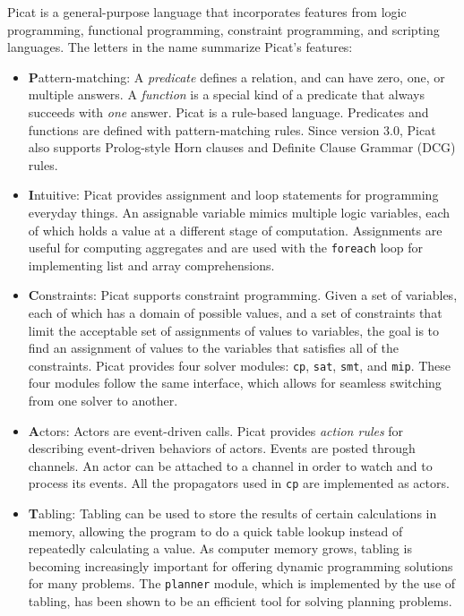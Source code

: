 Picat is a general-purpose language that incorporates features from logic programming, functional programming, constraint programming,  and scripting languages. The letters in the name summarize Picat's features:

\begin{itemize}
\item \textbf{P}attern-matching: A \emph{predicate} defines a relation, and can have zero, one, or multiple answers. A \emph{function} is a special kind of a predicate that always succeeds with \emph{one} answer. Picat is a rule-based language. Predicates and functions are defined with pattern-matching rules. Since version 3.0, Picat also supports Prolog-style Horn clauses and Definite Clause Grammar (DCG) rules.

\item \textbf{I}ntuitive: Picat provides assignment and loop statements for programming everyday things. An assignable variable mimics multiple logic variables, each of which holds a value at a different stage of computation. Assignments are useful for computing aggregates and are used with the {\tt foreach} loop for implementing list and array comprehensions.

\item \textbf{C}onstraints: Picat supports constraint programming.  Given a set of variables, each of which has a domain of possible values, and a set of constraints that limit the acceptable set of assignments of values to variables, the goal is to find an assignment of values to the variables that satisfies all of the constraints. Picat provides four solver modules: {\tt cp}, {\tt sat}, {\tt smt}, and {\tt mip}. These four modules follow the same interface, which allows for seamless switching from one solver to another.

\item \textbf{A}ctors: Actors are event-driven calls.  Picat provides \emph{action rules} for describing event-driven behaviors of actors. Events are posted through channels. An actor can be attached to a channel in order to watch and to process its events. All the propagators used in {\tt cp} are implemented as actors.

\item \textbf{T}abling: Tabling can be used to store the results of certain calculations in memory, allowing the program to do a quick table lookup instead of repeatedly calculating a value. As computer memory grows, tabling is becoming increasingly important for offering dynamic programming solutions for many problems. The \texttt{planner} module, which is implemented by the use of tabling, has been shown to be an efficient tool for solving planning problems.

\end{itemize}

